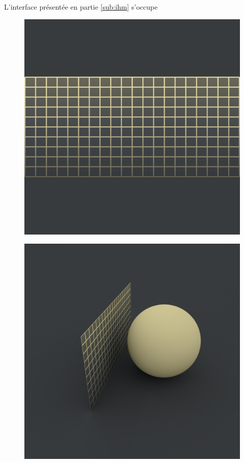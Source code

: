		L'interface présentée en partie \ref{sub:ihm} s'occupe
		\begin{figure}[htb]
			\centering
			\begin{minipage}{.5\textwidth}
				\centering
				\includegraphics[width=0.95\linewidth]{figures/def0.png}
				\label{fig:def0}
			\end{minipage}%
			\begin{minipage}{.5\textwidth}
				\centering
				\includegraphics[width=0.95\linewidth]{figures/def1.png}
				\label{fig:def1}
			\end{minipage}
			

\end{figure}

